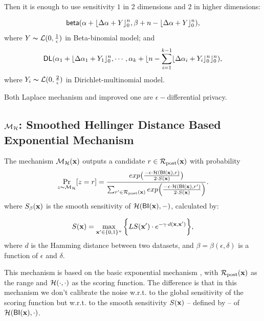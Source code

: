 \documentclass{article}
\begin{document}
 Then it is enough to use sensitivity $1$ in 2 dimensions and $2$ in higher dimensions:

 \[
 \mathsf{beta}(\alpha +  \lfloor{\Delta \alpha + Y}\rfloor^n_0,\beta + n - \lfloor{\Delta \alpha + Y}\rfloor^n_0),
 \]
 where $Y \thicksim \mathcal{L}(0, \frac{1}{\epsilon})$ in Beta-binomial model; and
 \[
 \mathsf{DL}(\alpha_1 +  \lfloor{\Delta \alpha_1 + Y_1}\rfloor^n_0, \cdots, \alpha_k + \lfloor n - \sum_{i = 1}^{k-1}\lfloor{\Delta \alpha_i + Y_i}\rfloor^n_0 \rfloor^n_0),
 \]
where $Y_i \thicksim \mathcal{L}(0, \frac{2}{\epsilon})$ in Dirichlet-multinomial model.

Both Laplace mechanism and improved one are $\epsilon -$differential privacy\cite{dwork2014algorithmic}.


\subsection{$\mathcal{M}_{\mathcal{H}}$: Smoothed Hellinger Distance Based Exponential Mechanism}
\label{subsec_hexpmech}

\begin{definition}
\label{def_smoo}
The mechanism $\mathcal{M}_{\mathcal{H}}(\textbf{x})$ outputs a candidate $r \in \mathcal{R}_{\textup{post}}(\textbf{x})$ with probability
\begin{equation*}
\underset{z \thicksim \mathcal{M}_{\mathcal{H}}}{\Pr}[z=r] = \frac {exp\big(\frac{-\epsilon\cdot\mathcal{H}(\mathsf{BI}(\textbf{x}),r)}{2\cdot S(\textbf{x})}\big)}
{\sum_{r'\in \mathcal{R}_{\textup{post}}(\textbf{x})} exp \Big(\frac{-\epsilon\cdot \mathcal{H} (\mathsf{BI}(\textbf{x}),r')}{2 \cdot S(\textbf{x})}\Big)}.
\end{equation*}
where $S_\beta(\textbf{x})$ is the smooth sensitivity of $\mathcal{H}(\mathsf{BI}(\textbf{x}),-)$, calculated by:

\begin{equation}
  \label{eq:smooth}
   S(\textbf{x})=\max_{\textbf{x}' \in \{0,1\}^{n}}\bigg \{LS(\textbf{x}') \cdot e^{-\gamma\cdot d(\textbf{x},\textbf{x}')}\bigg\},
\end{equation}
where $d$ is the Hamming distance between two datasets, and $\beta =
\beta(\epsilon, \delta)$ is a function of $\epsilon$ and $\delta$. 
\end{definition}

This mechanism is based on the basic exponential mechanism
\cite{talwar}, with $\mathcal{R}_{\textup{post}}(\textbf{x})$ as the range and
$\mathcal{H}(\cdot,\cdot)$ as the scoring function. The difference is
that in this mechanism we don't calibrate the noise w.r.t. to the
global sensitivity of the scoring function but w.r.t. to the smooth
sensitivity $S(\textbf{x})$ -- defined by \cite{nissim2007smooth}-- of
$\mathcal{H}(\mathsf{BI}(\textbf{x}), \cdot)$.
\end{document}
